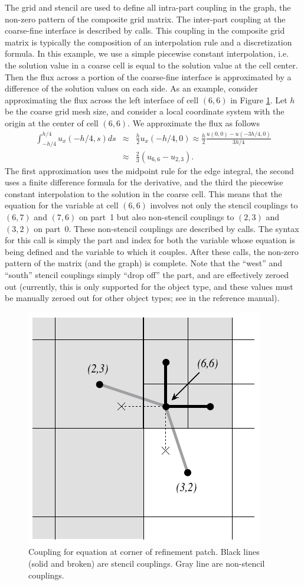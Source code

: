 The grid and stencil are used to define all intra-part coupling in the graph,
the non-zero pattern of the composite grid matrix.  The inter-part coupling at
the coarse-fine interface is described by  calls.  This
coupling in the composite grid matrix is typically the composition of an
interpolation rule and a discretization formula.  In this example, we use a
simple piecewise constant interpolation, i.e. the solution value in a coarse
cell is equal to the solution value at the cell center.  Then the flux across a
portion of the coarse-fine interface is approximated by a difference of the
solution values on each side.  As an example, consider approximating the flux
across the left interface of cell $(6,6)$ in Figure
\ref{fig-sstruct-samr-stencil}.  Let $h$ be the coarse grid mesh size, and
consider a local coordinate system with the origin at the center of cell
$(6,6)$.  We approximate the flux as follows
\begin{eqnarray}
\int_{-h/4}^{h/4}{u_x(-h/4,s)} ds
& \approx & \frac{h}{2} u_x(-h/4,0)
  \approx \frac{h}{2} \frac{u(0,0)-u(-3h/4,0)}{3h/4} \\
& \approx & \frac{2}{3} (u_{6,6}-u_{2,3}) \nonumber .
\end{eqnarray} 
The first approximation uses the midpoint rule for the edge integral, the second
uses a finite difference formula for the derivative, and the third the piecewise
constant interpolation to the solution in the coarse cell.  This means that the
equation for the variable at cell $(6,6)$ involves not only the stencil
couplings to $(6,7)$ and $(7,6)$ on part~1 but also non-stencil couplings to
$(2,3)$ and $(3,2)$ on part~0.  These non-stencil couplings are described by
 calls.  The syntax for this call is simply the part and
index for both the variable whose equation is being defined and the variable to
which it couples.  After these calls, the non-zero pattern of the matrix (and
the graph) is complete.  Note that the ``west'' and ``south'' stencil couplings
simply ``drop off'' the part, and are effectively zeroed out (currently, this is
only supported for the  object type, and these values must be
manually zeroed out for other object types; see  in
the reference manual).

\begin{figure}
\centering
\includegraphics[width=.4\textwidth]{figSStructExample2b}
\caption{%
Coupling for equation at corner of refinement patch. Black lines
(solid and broken) are stencil couplings. Gray line are non-stencil
couplings.}
\label{fig-sstruct-samr-stencil}
\end{figure}


